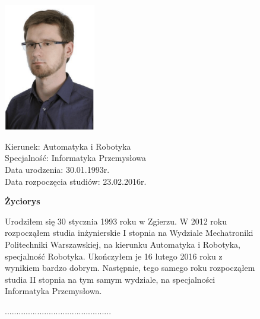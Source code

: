 \begin{figure}[ht]
\begin{doublespacing}
	\begin{minipage}[b]{0.4\linewidth}
		\includegraphics[width=4cm]{img/authors_picture.png}
	\end{minipage}
	\begin{minipage}[b]{0.5\linewidth}
		Kierunek:  Automatyka i Robotyka \\
		Specjalność:  Informatyka Przemysłowa \\
		Data urodzenia:  30.01.1993r. \\
		Data rozpoczęcia studiów:  23.02.2016r. \\
	\end{minipage}
	
	\hspace{2cm}
	
	\begin{center}
		\huge{\textbf{Życiorys}} \\
	\end{center}
	

Urodziłem się 30 stycznia 1993 roku w Zgierzu. W 2012 roku rozpocząłem studia inżynierskie I stopnia na Wydziale Mechatroniki Politechniki Warszawskiej, na kierunku Automatyka i Robotyka, specjalność Robotyka. Ukończyłem je 16 lutego 2016 roku z wynikiem bardzo dobrym. Następnie, tego samego roku  rozpocząłem studia II stopnia na tym samym wydziale, na specjalności Informatyka Przemysłowa. \\

	\vspace{2cm}
	\begin{flushright}
				.............................................. \\
	\end{flushright}
\end{doublespacing}
\end{figure}


